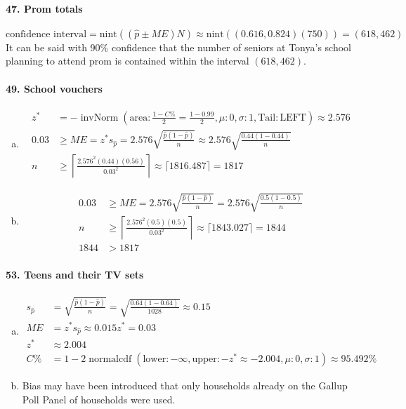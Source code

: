 \documentclass[12pt, A4]{article}
\DeclareMathOperator{\invNorm}{invNorm}
\DeclareMathOperator{\normalcdf}{normalcdf}
\newcommand{\invNormal}[4]{\invNorm\left(\mathrm{area}:#1, \mu: #2, \sigma: #3, \mathrm{Tail: #4}\right)}
\newcommand{\normalCDF}[4]{\normalcdf\left(\mathrm{lower}: #1, \mathrm{upper}: #2, \mu: #3, \sigma: #4\right)}
\newcommand{\propse}[2]{\sqrt{\frac{#1\left(1 - #1\right)}{#2}}}
\newcommand{\nint}[1]{\mathrm{nint}\left(#1\right)}
\begin{document}
		\paragraph{47. Prom totals}
			\[
				\text{confidence interval} = \nint{(\hat{p} \pm ME)N} \approx \nint{(0.616, 0.824)(750)} = (618, 462)
			\]
			It can be said with 90\% confidence that the number of seniors at Tonya's school planning to attend prom is contained within the interval $(618, 462)$.
		\paragraph{49. School vouchers}
			\begin{enumerate}[a.] 
				\item
					\begin{align*}
						z^* &= -\invNormal{\frac{1 - C\%}{2} = \frac{1 - 0.99}{2}}{0}{1}{LEFT} \approx 2.576 \\
						0.03 &\ge ME	 = z^*s_{\hat{p}} = 2.576 \propse{\hat{p}}{n} \approx 2.576\propse{0.44}{n} \\
						n &\ge \left\lceil\frac{2.576^2(0.44)(0.56)}{0.03^2}\right\rceil \approx \lceil 1816.487 \rceil = 1817
					\end{align*}
				\item
					\begin{align*}
						0.03 &\ge ME = 2.576\sqrt{\frac{\hat{p}(1 - \hat{p})}{n}} = 2.576\sqrt{\frac{0.5(1 - 0.5)}{n}} \\ 
						n &\ge \left\lceil\frac{2.576^2(0.5)(0.5)}{0.03^2}\right\rceil \approx \lceil 1843.027 \rceil = 1844 \\
						1844 &> 1817
					\end{align*}
			\end{enumerate}
		\paragraph{53. Teens and their TV sets}
			\begin{enumerate}[a.]
				\item
					\begin{align*}
						s_{\hat{p}} &= \propse{\hat{p}}{n} = \propse{0.64}{1028} \approx 0.15 \\
						ME &= z^*s_{\hat{p}} \approx 0.015z^* = 0.03\\
						z^* &\approx 2.004 \\
						C\% &= 1 - 2\normalCDF{-\infty}{-z^* \approx -2.004}{0}{1} \approx 95.492\%
					\end{align*}
				\item
					Bias may have been introduced that only households already on the Gallup Poll Panel of households were used.
			\end{enumerate}
\end{document}
